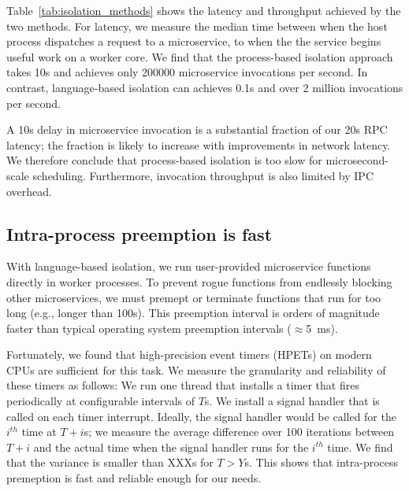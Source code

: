 Table~\ref{tab:isolation_methods} shows the latency and throughput achieved
by the two methods. For latency, we measure the median time between when the host
process dispatches a request to a microservice, to when the the service begins
useful work on a worker core. We find that the process-based isolation approach
takes 10\textmu{}s and achieves only 200000 microservice invocations per
second. In contrast, language-based isolation can achieves 0.1\textmu{}s and
over 2 million invocations per second.

A 10\textmu{}s delay in microservice invocation is a substantial fraction of our
20\textmu{}s RPC latency; the fraction is likely to increase with
improvements in network latency. We therefore conclude that process-based
isolation is too slow for microsecond-scale scheduling. Furthermore, invocation
throughput is also limited by IPC overhead.

\subsection{Intra-process preemption is fast}
With language-based isolation, we run user-provided microservice functions
directly in worker processes. To prevent rogue functions from endlessly blocking
other microservices, we must premept or terminate functions that run for too
long (e.g., longer than 100\textmu{}s).  This
preemption interval is orders of magnitude faster than typical operating
system preemption intervals ($\approx$5~ms).

Fortunately, we found that high-precision event timers (HPETs) on modern CPUs
are sufficient for this task. We measure the granularity and reliability of
these timers as follows: We run one thread that installs a timer that fires
periodically at configurable intervals of $T$\textmu{}s. We install a signal
handler that is called on each timer interrupt. Ideally, the signal handler
would be called for the $i^{th}$ time at $T + i$\textmu{}s; we measure the
average difference over 100 iterations between $T + i$ and the actual time
when the signal handler runs for the $i^{th}$ time. We find that the variance
is smaller than XXX\textmu{}s for $T > Y$\textmu{}s. This shows that
intra-process premeption is fast and reliable enough for our needs.

